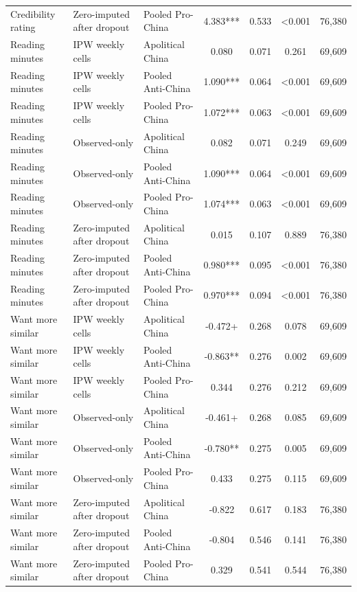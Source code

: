 \begin{table}[H]
\begin{threeparttable}
\begin{tabular}{lllcccc}
Credibility rating & Zero-imputed after dropout & Pooled Pro-China & 4.383*** & 0.533 & <0.001 & 76,380 \\
Reading minutes & IPW weekly cells & Apolitical China & 0.080 & 0.071 & 0.261 & 69,609 \\
Reading minutes & IPW weekly cells & Pooled Anti-China & 1.090*** & 0.064 & <0.001 & 69,609 \\
Reading minutes & IPW weekly cells & Pooled Pro-China & 1.072*** & 0.063 & <0.001 & 69,609 \\
Reading minutes & Observed-only & Apolitical China & 0.082 & 0.071 & 0.249 & 69,609 \\
Reading minutes & Observed-only & Pooled Anti-China & 1.090*** & 0.064 & <0.001 & 69,609 \\
Reading minutes & Observed-only & Pooled Pro-China & 1.074*** & 0.063 & <0.001 & 69,609 \\
Reading minutes & Zero-imputed after dropout & Apolitical China & 0.015 & 0.107 & 0.889 & 76,380 \\
Reading minutes & Zero-imputed after dropout & Pooled Anti-China & 0.980*** & 0.095 & <0.001 & 76,380 \\
Reading minutes & Zero-imputed after dropout & Pooled Pro-China & 0.970*** & 0.094 & <0.001 & 76,380 \\
Want more similar & IPW weekly cells & Apolitical China & -0.472+ & 0.268 & 0.078 & 69,609 \\
Want more similar & IPW weekly cells & Pooled Anti-China & -0.863** & 0.276 & 0.002 & 69,609 \\
Want more similar & IPW weekly cells & Pooled Pro-China & 0.344 & 0.276 & 0.212 & 69,609 \\
Want more similar & Observed-only & Apolitical China & -0.461+ & 0.268 & 0.085 & 69,609 \\
Want more similar & Observed-only & Pooled Anti-China & -0.780** & 0.275 & 0.005 & 69,609 \\
Want more similar & Observed-only & Pooled Pro-China & 0.433 & 0.275 & 0.115 & 69,609 \\
Want more similar & Zero-imputed after dropout & Apolitical China & -0.822 & 0.617 & 0.183 & 76,380 \\
Want more similar & Zero-imputed after dropout & Pooled Anti-China & -0.804 & 0.546 & 0.141 & 76,380 \\
Want more similar & Zero-imputed after dropout & Pooled Pro-China & 0.329 & 0.541 & 0.544 & 76,380 \\
\bottomrule

\end{tabular}
\end{threeparttable}
\end{table}
